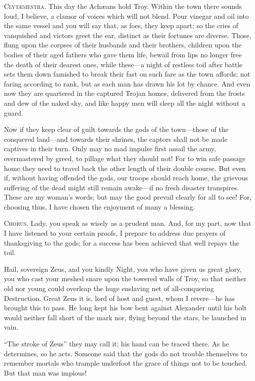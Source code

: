 \documentclass[12pt]{article}
\begin{document}
\textsc{Clyt{\ae}mestra.} This day the Ach{\ae}ans hold Troy. Within the town there sounds loud, I believe, a clamor of voices which will not blend. Pour vinegar and oil into the same vessel and you will say that, as foes, they keep apart; so the cries of vanquished and victors greet the ear, distinct as their fortunes are diverse. Those, flung upon the corpses of their husbands and their brothers, children upon the bodies of their aged fathers who gave them life, bewail from lips no longer free the death of their dearest ones, while these---a night of restless toil after battle sets them down famished to break their fast on such fare as the town affords; not faring according to rank, but as each man has drawn his lot by chance. And even now they are quartered in the captured Trojan homes, delivered from the frosts and dew of the naked sky, and like happy men will sleep all the night without a guard.

Now if they keep clear of guilt towards the gods of the town---those of the conquered land---and towards their shrines, the captors shall not be made captives in their turn. Only may no mad impulse first assail the army, overmastered by greed, to pillage what they should not! For to win safe passage home they need to travel back the other length of their double course. But even if, without having offended the gods, our troops should reach home, the grievous suffering of the dead might still remain awake---if no fresh disaster transpires. These are my woman's words; but may the good prevail clearly for all to see! For, choosing thus, I have chosen the enjoyment of many a blessing.

\textsc{Chorus.} Lady, you speak as wisely as a prudent man. And, for my part, now that I have listened to your certain proofs, I prepare to address due prayers of thanksgiving to the gods; for a success has been achieved that well repays the toil.

Hail, sovereign Zeus, and you kindly Night, you who have given us great glory, you who cast your meshed snare upon the towered walls of Troy, so that neither old nor young could overleap the huge enslaving net of all-conquering Destruction. Great Zeus it is, lord of host and guest, whom I revere---he has brought this to pass. He long kept his bow bent against Alexander until his bolt would neither fall short of the mark nor, flying beyond the stars, be launched in vain.

``The stroke of Zeus'' they may call it; his hand can be traced there. As he determines, so he acts. Someone said that the gods do not trouble themselves to remember mortals who trample underfoot the grace of things not to be touched. But that man was impious!
\end{document}
